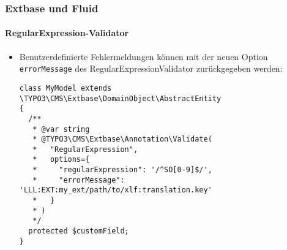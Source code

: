%

\begin{frame}[fragile]
	\frametitle{Extbase und Fluid}
	\framesubtitle{RegularExpression-Validator}

	\lstset{basicstyle=\tiny\ttfamily}

	\begin{itemize}
		\item Benutzerdefinierte Fehlermeldungen können mit der neuen Option
			\texttt{errorMessage} des RegularExpressionValidator zurückgegeben werden:
\begin{lstlisting}
class MyModel extends \TYPO3\CMS\Extbase\DomainObject\AbstractEntity
{
  /**
   * @var string
   * @TYPO3\CMS\Extbase\Annotation\Validate(
   *   "RegularExpression",
   *   options={
   *     "regularExpression": '/^SO[0-9]$/',
   *     "errorMessage": 'LLL:EXT:my_ext/path/to/xlf:translation.key'
   *   }
   * )
   */
  protected $customField;
}
\end{lstlisting}

	\end{itemize}

\end{frame}

